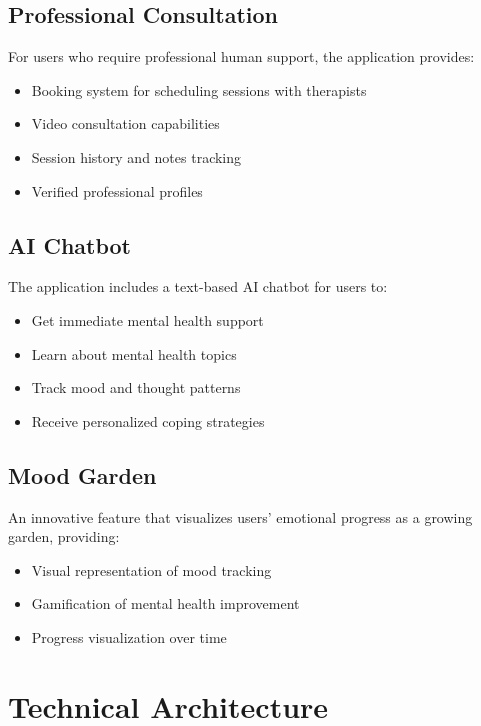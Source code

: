 \documentclass[11pt,a4paper]{article}
\begin{document}
\subsection{Professional Consultation}
For users who require professional human support, the application provides:
\begin{itemize}
    \item Booking system for scheduling sessions with therapists
    \item Video consultation capabilities
    \item Session history and notes tracking
    \item Verified professional profiles
\end{itemize}

\subsection{AI Chatbot}
The application includes a text-based AI chatbot for users to:
\begin{itemize}
    \item Get immediate mental health support
    \item Learn about mental health topics
    \item Track mood and thought patterns
    \item Receive personalized coping strategies
\end{itemize}

\subsection{Mood Garden}
An innovative feature that visualizes users' emotional progress as a growing garden, providing:
\begin{itemize}
    \item Visual representation of mood tracking
    \item Gamification of mental health improvement
    \item Progress visualization over time
\end{itemize}

\section{Technical Architecture}
\end{document}
